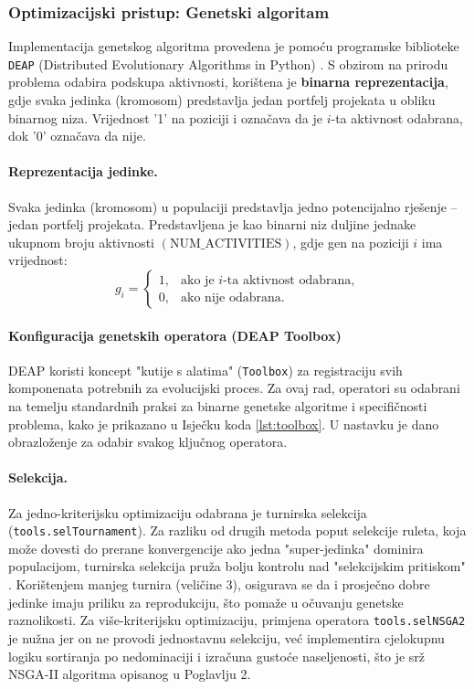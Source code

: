 \subsubsection{Optimizacijski pristup: Genetski algoritam}

Implementacija genetskog algoritma provedena je pomoću programske biblioteke \texttt{DEAP} (Distributed Evolutionary Algorithms in Python) \cite{DEAP2012}. 
S obzirom na prirodu problema odabira podskupa aktivnosti, korištena je \textbf{binarna reprezentacija}, gdje svaka jedinka (kromosom) predstavlja jedan portfelj projekata u obliku binarnog niza. Vrijednost '1' na poziciji i označava da je $i$-ta aktivnost odabrana, dok '0' označava da nije.
\paragraph{Reprezentacija jedinke.}
Svaka jedinka (kromosom) u populaciji predstavlja jedno potencijalno rješenje – jedan portfelj projekata. 
Predstavljena je kao binarni niz duljine jednake ukupnom broju aktivnosti $(\text{NUM\_ACTIVITIES})$, gdje gen na poziciji $i$ ima vrijednost:
\[
g_i =
\begin{cases}
1, & \text{ako je $i$-ta aktivnost odabrana}, \\
0, & \text{ako nije odabrana}.
\end{cases}
\]
\paragraph{Konfiguracija genetskih operatora (DEAP Toolbox)}

DEAP koristi koncept "kutije s alatima" (\texttt{Toolbox}) za registraciju svih komponenata potrebnih za evolucijski proces. Za ovaj rad, operatori su odabrani na temelju standardnih praksi za binarne genetske algoritme i specifičnosti problema, kako je prikazano u Isječku koda \ref{lst:toolbox}. U nastavku je dano obrazloženje za odabir svakog ključnog operatora.

\paragraph{Selekcija.}
     Za jedno-kriterijsku optimizaciju odabrana je turnirska selekcija \\ (\texttt{tools.selTournament}). Za razliku od drugih metoda poput selekcije ruleta, koja može dovesti do prerane konvergencije ako jedna "super-jedinka" dominira populacijom, turnirska selekcija pruža bolju kontrolu nad "selekcijskim pritiskom" \cite{Goldberg1989}. Korištenjem manjeg turnira (veličine 3), osigurava se da i prosječno dobre jedinke imaju priliku za reprodukciju, što pomaže u očuvanju genetske raznolikosti. Za više-kriterijsku optimizaciju, primjena operatora \texttt{tools.selNSGA2} je nužna jer on ne provodi jednostavnu selekciju, već implementira cjelokupnu logiku sortiranja po nedominaciji i izračuna gustoće naseljenosti, što je srž NSGA-II algoritma opisanog u Poglavlju 2.

